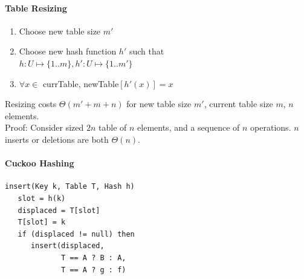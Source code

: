\paragraph{Table Resizing}
\begin{enumerate}
  \item Choose new table size $m'$
  \item Choose new hash function $h'$ such that\\
    $h:U\mapsto\{1..m\}, h':U\mapsto\{1..m'\}$
  \item $\forall{x}\in$ currTable, newTable$[h' (x)] = x$
\end{enumerate}
Resizing costs $\Theta(m' + m + n)$ for new table size $m'$, current table size $m$, $n$ elements.\\
Proof: Consider sized $2n$ table of $n$ elements, and a sequence of $n$
operations. $n$ inserts or deletions are both $\Theta(n)$.
\paragraph{Cuckoo Hashing}
\begin{verbatim}
insert(Key k, Table T, Hash h)
   slot = h(k)
   displaced = T[slot]
   T[slot] = k
   if (displaced != null) then
      insert(displaced,
             T == A ? B : A,
             T == A ? g : f)
\end{verbatim}
